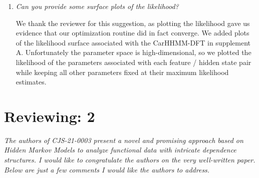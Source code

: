 \documentclass{article}
\begin{document}
\begin{enumerate}
\begin{enumerate}
        \item \textit{Can you provide some surface plots of the likelihood?} 
        
        We thank the reviewer for this suggestion, as plotting the likelihood gave us evidence that our optimization routine did in fact converge. We added plots of the likelihood surface associated with the CarHHMM-DFT in supplement A. Unfortunately the parameter space is high-dimensional, so we plotted the likelihood of the parameters associated with each feature / hidden state pair while keeping all other parameters fixed at their maximum likelihood estimates.
        
    \end{enumerate}

\end{enumerate}


\section{Reviewing: 2}

\textit{The authors of CJS-21-0003 present a novel and promising approach based on Hidden Markov Models to analyze functional data with intricate dependence structures. I would like to congratulate the authors on the very well-written paper. Below are just a few comments I would like the authors to address.}
\end{document}
